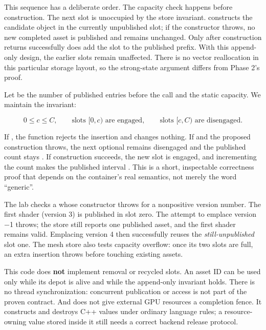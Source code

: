 This sequence has a deliberate order. The capacity check happens before construction. The next slot is unoccupied by the store invariant.  constructs the candidate object in the currently unpublished slot; if the constructor throws, no new completed asset is published and  remains unchanged. Only after construction returns successfully does  add the slot to the published prefix. With this append-only design, the earlier slots remain unaffected. There is no vector reallocation in this particular storage layout, so the strong-state argument differs from Phase 2's  proof.

Let  be the number of published entries before the call and  the static capacity. We maintain the invariant:

\[
0\le c\le C,\qquad
\text{slots }[0,c)\text{ are engaged},\qquad
\text{slots }[c,C)\text{ are disengaged}.
\]

If , the function rejects the insertion and changes nothing. If  and the proposed construction throws, the next optional remains disengaged and the published count stays . If construction succeeds, the new slot is engaged, and incrementing the count makes the published interval \BookInlineCode{{{[}}{0}{,}{c}{+}{1}{)}}{{[}0,c+1)}. This is a short, inspectable correctness proof that depends on the container's real semantics, not merely the word ``generic''.

The lab checks a  whose constructor throws for a nonpositive version number. The first shader (version 3) is published in slot zero. The attempt to emplace version −1 throws; the store still reports one published asset, and the first shader remains valid. Emplacing version 4 then successfully reuses the \emph{still-unpublished} slot one. The mesh store also tests capacity overflow: once its two slots are full, an extra insertion throws before touching existing assets.

This code does \textbf{not} implement removal or recycled slots. An asset ID can be used only while its depot is alive and while the append-only invariant holds. There is no thread synchronization: concurrent publication or access is not part of the proven contract. And  does not give external GPU resources a completion fence. It constructs and destroys C++ values under ordinary language rules; a resource-owning value stored inside it still needs a correct backend release protocol.

